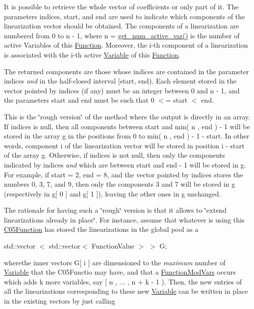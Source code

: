 It is possible to retrieve the whole vector of coefficients or only part of it. The parameters indices, start, and end are used to indicate which components of the linearization vector should be obtained. The components of a linearization are numbered from 0 to n -\/ 1, where n = \mbox{\hyperlink{group___thin_var_dep_interface___c_l_a_s_s_e_s_ga6dbf09c17736b358d11f617e15856981}{get\+\_\+num\+\_\+active\+\_\+var()}} is the number of active Variables of this \mbox{\hyperlink{class_s_m_spp__di__unipi__it_1_1_function}{Function}}. Moreover, the i-\/th component of a linearization is associated with the i-\/th active \mbox{\hyperlink{class_s_m_spp__di__unipi__it_1_1_variable}{Variable}} of this \mbox{\hyperlink{class_s_m_spp__di__unipi__it_1_1_function}{Function}}.

The returned components are those whose indices are contained in the parameter indices {\itshape and} in the half-\/closed interval \mbox{[}start, end). Each element stored in the vector pointed by indices (if any) must be an integer between 0 and n -\/ 1, and the parameters start and end must be such that 0 $<$= start $<$ end.

This is the \char`\"{}rough version\char`\"{} of the method where the output is directly in an array. If indices is null, then all components between start and min( n , end ) -\/ 1 will be stored in the array g in the positions from 0 to min( n , end ) -\/ 1 -\/ start. In other words, component i of the linearization vector will be stored in position i -\/ start of the array g. Otherwise, if indices is not null, then only the components indicated by indices {\itshape and} which are between start and end -\/ 1 will be stored in g. For example, if start = 2, end = 8, and the vector pointed by indices stores the numbers 0, 3, 7, and 9, then only the components 3 and 7 will be stored in g (respectively in g\mbox{[} 0 \mbox{]} and g\mbox{[} 1 \mbox{]}), leaving the other ones in g unchanged.

The rationale for having such a \char`\"{}rough\char`\"{} version is that it allows to \char`\"{}extend linearizations already in place\char`\"{}. For instance, assume that whatever is using this \mbox{\hyperlink{class_s_m_spp__di__unipi__it_1_1_c05_function}{C05\+Function}} has stored the linearizations in the global pool as a

std\+::vector $<$ std\+::vector$<$ Function\+Value $>$ $>$ G;

wherethe inner vectors G\mbox{[} i \mbox{]} are dimensioned to the {\itshape maximum} number of \mbox{\hyperlink{class_s_m_spp__di__unipi__it_1_1_variable}{Variable}} that the C05\+Functio may have, and that a \mbox{\hyperlink{class_s_m_spp__di__unipi__it_1_1_function_mod_vars}{Function\+Mod\+Vars}} occurs which adds k more variables, say \mbox{[} n , ... , n + k -\/ 1 ). Then, the new entries of all the linearizations corresponding to these new \mbox{\hyperlink{class_s_m_spp__di__unipi__it_1_1_variable}{Variable}} can be written in place in the existing vectors by just calling


